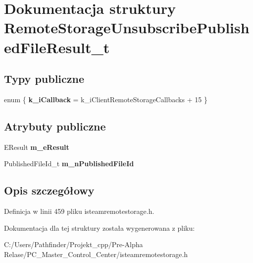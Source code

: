 \hypertarget{struct_remote_storage_unsubscribe_published_file_result__t}{}\section{Dokumentacja struktury Remote\+Storage\+Unsubscribe\+Published\+File\+Result\+\_\+t}
\label{struct_remote_storage_unsubscribe_published_file_result__t}
\subsection*{Typy publiczne}
\begin{DoxyCompactItemize}
\item 
\mbox{\label{struct_remote_storage_unsubscribe_published_file_result__t_a97b7d0b0854801e935bba63f745cd4db}} 
enum \{ {\bfseries k\+\_\+i\+Callback} = k\+\_\+i\+Client\+Remote\+Storage\+Callbacks + 15
 \}
\end{DoxyCompactItemize}
\subsection*{Atrybuty publiczne}
\begin{DoxyCompactItemize}
\item 
\mbox{\label{struct_remote_storage_unsubscribe_published_file_result__t_af604e72512d994306ad11cd5cd63aeff}} 
E\+Result {\bfseries m\+\_\+e\+Result}
\item 
\mbox{\label{struct_remote_storage_unsubscribe_published_file_result__t_af37123e1353f13f9c183b58cffd8c827}} 
Published\+File\+Id\+\_\+t {\bfseries m\+\_\+n\+Published\+File\+Id}
\end{DoxyCompactItemize}


\subsection{Opis szczegółowy}


Definicja w linii 459 pliku isteamremotestorage.\+h.



Dokumentacja dla tej struktury została wygenerowana z pliku\+:\begin{DoxyCompactItemize}
\item 
C\+:/\+Users/\+Pathfinder/\+Projekt\+\_\+cpp/\+Pre-\/\+Alpha Relase/\+P\+C\+\_\+\+Master\+\_\+\+Control\+\_\+\+Center/isteamremotestorage.\+h\end{DoxyCompactItemize}
